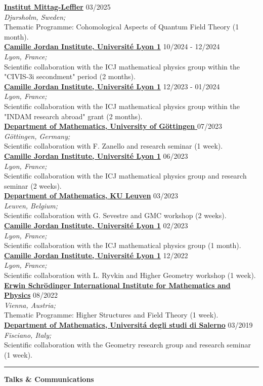 \documentclass[a4paper]{article}
\newcommand{\block}[1]{\hrule \vspace{0.2cm} \textbf{\Large #1} \vspace{0.2cm}}
\newcommand{\voice}[5]{\href{#4}{\textbf{#1}} \hfill #2 \\ \textit{#3} \\ {\small #5} \vspace{0.2cm} \\}
\begin{document}
    
    \voice{Institut Mittag-Leffler}
        {03/2025}
        {Djursholm, Sweden;}
        {https://www.mittag-leffler.se/activities/cohomological-aspects-of-quantum-field-theory/}       
        {Thematic Programme: Cohomological Aspects of Quantum Field Theory (1 month).}
    \voice{Camille Jordan Institute, Université Lyon 1}
        {10/2024 - 12/2024}
        {Lyon, France;}
        {None}       
        {Scientific collaboration with the ICJ mathematical physics group within the "CIVIS-3i secondment" period (2 months).}
    \voice{Camille Jordan Institute, Université Lyon 1}
        {12/2023 - 01/2024}
        {Lyon, France;}
        {None}       
        {Scientific collaboration with the ICJ mathematical physics group within the "INDAM research abroad" grant (2 months).}
    \voice{Department of Mathematics, University of Göttingen }
        {07/2023}
        {Göttingen, Germany;}
        {None}       
        {Scientific collaboration with F. Zanello and research seminar (1 week).}
    \voice{Camille Jordan Institute, Université Lyon 1}
        {06/2023}
        {Lyon, France;}
        {None}       
        {Scientific collaboration with the ICJ mathematical physics group and research seminar (2 weeks).}
    \voice{Department of Mathematics, KU Leuven}
        {03/2023}
        {Leuven, Belgium;}
        {None}       
        {Scientific collaboration with G. Sevestre and GMC workshop (2 weeks).}
    \voice{Camille Jordan Institute, Université Lyon 1}
        {02/2023}
        {Lyon, France;}
        {None}       
        {Scientific collaboration with the ICJ mathematical physics group (1 month).}
    \voice{Camille Jordan Institute, Université Lyon 1}
        {12/2022}
        {Lyon, France;}
        {None}       
        {Scientific collaboration with L. Ryvkin and Higher Geometry workshop (1 week).}
    \voice{Erwin Schrödinger International Institute for Mathematics and Physics}
        {08/2022}
        {Vienna, Austria;}
        {https://www.esi.ac.at/events/e430/}       
        {Thematic Programme: Higher Structures and Field Theory (1 week).}
    \voice{Department of Mathematics, Universit\'a degli studi di Salerno}
        {03/2019}
        {Fisciano, Italy;}
        {http://geometria.dipmat.unisa.it/events.html}       
        {Scientific collaboration with the Geometry research group and research seminar (1 week).}

    \block{Talks \& Communications}
\end{document}
